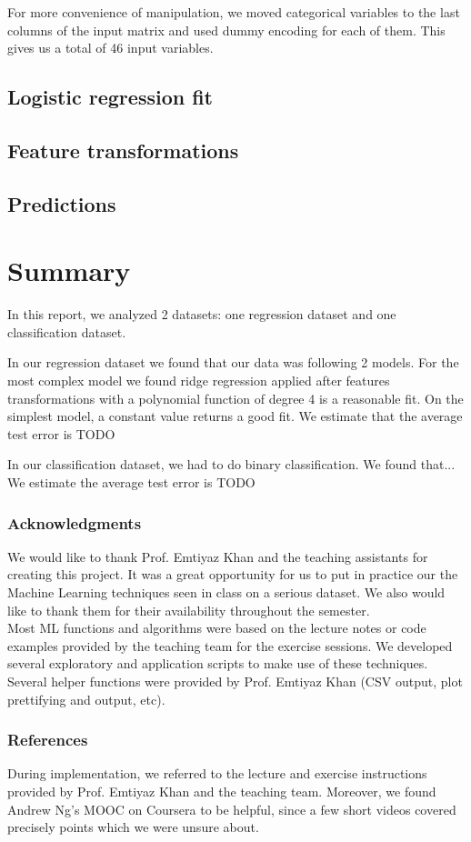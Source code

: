 \documentclass{article} %
\begin{document}
  For more convenience of manipulation, we moved categorical variables to the last columns of the input matrix and used dummy encoding for each of them. This gives us a total of 46 input variables.

  \subsection{Logistic regression fit}

  \subsection{Feature transformations}

  \subsection{Predictions}


\section{Summary}
In this report, we analyzed 2 datasets: one regression dataset and one classification dataset. 

In our regression dataset we found that our data was following 2 models. For the most complex model we found ridge regression applied after features transformations with a polynomial function of degree 4 is a reasonable fit. On the simplest model, a constant value returns a good fit. We estimate that the average test error is TODO

In our classification dataset, we had to do binary classification. We found that... We estimate the average test error is TODO

\subsubsection*{Acknowledgments}
  We would like to thank Prof. Emtiyaz Khan and the teaching assistants for creating this project. It was a great opportunity for us to put in practice our the Machine Learning techniques seen in class on a serious dataset. We also would like to thank them for their availability throughout the semester.\\
  Most ML functions and algorithms were based on the lecture notes or code examples provided by the teaching team for the exercise sessions. We developed several exploratory and application scripts to make use of these techniques. Several helper functions were provided by Prof. Emtiyaz Khan (CSV output, plot prettifying and output, etc).

\subsubsection*{References}
  During implementation, we referred to the lecture and exercise instructions provided by Prof. Emtiyaz Khan and the teaching team. Moreover, we found Andrew Ng's MOOC on Coursera to be helpful, since a few short videos covered precisely points which we were unsure about.
\end{document}
